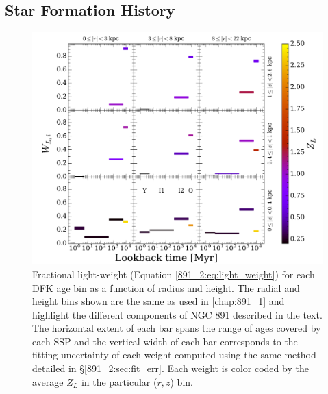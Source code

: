 
\subsection{Star Formation History}
\label{891_2:sec:SFH}
\begin{figure}
  \centering
  \includegraphics[width=\textwidth]{891_2/figs/SFH_cuts.pdf}
  \caption[SSP light weights in ($r,|z|$)
    grid]{\fixspacing\label{891_2:fig:SFH_cuts}Fractional light-weight
    (Equation \ref{891_2:eq:light_weight}) for each DFK age bin as a
    function of radius and height. The radial and height bins shown
    are the same as used in \ref{chap:891_1} and highlight the
    different components of NGC 891 described in the text. The
    horizontal extent of each bar spans the range of ages covered by
    each SSP and the vertical width of each bar corresponds to the
    fitting uncertainty of each weight computed using the same method
    detailed in \S\ref{891_2:sec:fit_err}. Each weight is color coded
    by the average $Z_L$ in the particular ($r,z$) bin.  }

\end{figure}

